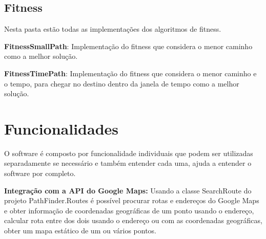 \subsection{Fitness}

Nesta pasta estão todas as implementações dos algoritmos de fitness.

\textbf{FitnessSmallPath}: Implementação do fitness que considera o menor caminho como a melhor solução.

\textbf{FitnessTimePath}: Implementação do fitness que considera o menor caminho e o tempo, para chegar no destino dentro da janela de tempo como a melhor solução.

\section{Funcionalidades}
O software é composto por funcionalidade individuais que podem ser utilizadas separadamente se necessário e também entender cada uma, ajuda a entender o software por completo.

\textbf{Integração com a API do Google Maps:} Usando a classe SearchRoute do projeto PathFinder.Routes é possível procurar rotas e endereços do Google Maps e obter informação de coordenadas geográficas de um ponto usando o endereço, calcular rota entre dos dois usando o endereço ou com as coordenadas geográficas, obter um mapa estático de um ou vários pontos.